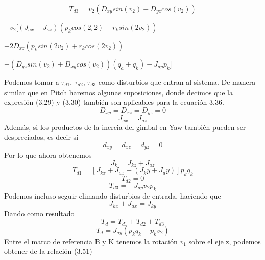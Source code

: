 \begin{equation}
	T_{d3} = \ddot{v}_2(D_{xy}sin(v_2)-D_{yz}cos(v_2))
\end{equation}
\begin{center}
	$+ \dot{v}_2[(J_{ax}-J_{az})(p_kcos(2_v2)-r_ksin(2v_2))$
\end{center}
\begin{center}
	$+2D_{xz}(p_ksin(2v_2)+r_kcos(2v_2))$
\end{center}
\begin{center}
	$
	+(D_{yz}sin(v_2) + D_{xy}cos(v_2))(q_a+q_k) - J_{ay}p_k]
	$
\end{center}
Podemos tomar a $\tau_{d1}$, $\tau_{d2}$, $\tau_{d3}$ como disturbios que entran al sistema. De manera similar que en Pitch haremos algunas suposiciones, donde decimos que
la expresión (3.29) y (3.30) también son aplicables para la ecuación 3.36.
\begin{equation}
	D_{xy} = D_{xz} = D_{yz} = 0
\end{equation}
\begin{equation}
	J_{ax} = J_{az}
\end{equation}
Además, si los productos de la inercia del gimbal en Yaw también pueden ser despreciados, es decir si
\begin{equation}
	d_{xy} = d_{xz} = d_{yz} = 0
\end{equation}
Por lo que ahora obtenemos 
\begin{equation}
	J_k = J_{kz} + J_{az}
\end{equation}
\begin{equation}
	T_{d1} = [J_{kx} + J_{ax} - (J_ky + J_ay)]p_kq_k
\end{equation}
\begin{equation}
	T_{d2} = 0
\end{equation}
\begin{equation}
	T_{d3} = -J_{ay} \dot{v}_2p_k
\end{equation}
Podemos incluso seguir elimando disturbios de entrada, haciendo que
\begin{equation}
	J_{kx} + J_{ax} = J_{ky}
\end{equation}
Dando como resultado
\begin{equation}
	T_d = T_{d1} + T_{d2} + T_{d3}
\end{equation}
\begin{equation}
	T_d = J_{ay}(p_kq_k - p_k\dot{v}_2)
\end{equation}
Entre el marco de referencia B y K tenemos la rotación $v_1$ sobre el eje z, podemos obtener de \cite{Book:Barfoot2020} la relación (3.51)
